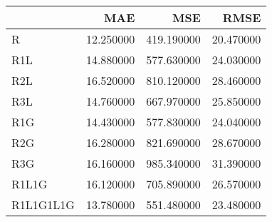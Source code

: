 \begin{tabular}{lrrr}
\toprule
 & MAE & MSE & RMSE \\
\midrule
R & 12.250000 & 419.190000 & 20.470000 \\
R1L & 14.880000 & 577.630000 & 24.030000 \\
R2L & 16.520000 & 810.120000 & 28.460000 \\
R3L & 14.760000 & 667.970000 & 25.850000 \\
R1G & 14.430000 & 577.830000 & 24.040000 \\
R2G & 16.280000 & 821.690000 & 28.670000 \\
R3G & 16.160000 & 985.340000 & 31.390000 \\
R1L1G & 16.120000 & 705.890000 & 26.570000 \\
R1L1G1L1G & 13.780000 & 551.480000 & 23.480000 \\
\bottomrule
\end{tabular}
